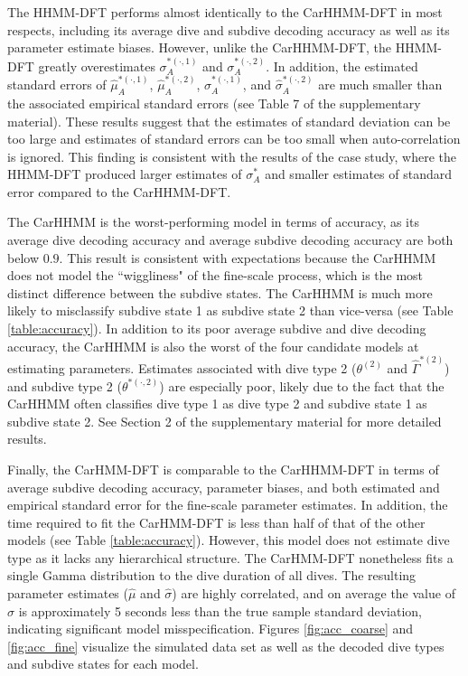 The HHMM-DFT performs almost identically to the CarHHMM-DFT in most respects, including its average dive and subdive decoding accuracy as well as its parameter estimate biases. However, unlike the CarHHMM-DFT, the HHMM-DFT greatly overestimates $\sigma_A^{*(\cdot,1)}$ and $\sigma_A^{*(\cdot,2)}$. In addition, the estimated standard errors of $\hat \mu_A^{*(\cdot,1)}$, $\hat \mu_A^{*(\cdot,2)}$, $\hat \sigma_A^{*(\cdot,1)}$, and $\hat \sigma_A^{*(\cdot,2)}$ are much smaller than the associated empirical standard errors (see Table 7 of the supplementary material). These results suggest that the estimates of standard deviation can be too large and estimates of standard errors can be too small when auto-correlation is ignored. This finding is consistent with the results of the case study, where the HHMM-DFT produced larger estimates of $\sigma_A^*$ and smaller estimates of standard error compared to the CarHHMM-DFT.

The CarHHMM is the worst-performing model in terms of accuracy, as its average dive decoding accuracy and average subdive decoding accuracy are both below $0.9$. This result is consistent with expectations because the CarHHMM does not model the ``wiggliness" of the fine-scale process, which is the most distinct difference between the subdive states. The CarHHMM is much more likely to misclassify subdive state 1 as subdive state 2 than vice-versa (see Table \ref{table:accuracy}). In addition to its poor average subdive and dive decoding accuracy, the CarHHMM is also the worst of the four candidate models at estimating parameters. Estimates associated with dive type 2 ($\theta^{(2)}$ and $\hat \Gamma^{*(2)}$) and subdive type 2 ($\theta^{*(\cdot,2)}$) are especially poor, likely due to the fact that the CarHHMM often classifies dive type 1 as dive type 2 and subdive state 1 as subdive state 2. See Section 2 of the supplementary material for more detailed results.

Finally, the CarHMM-DFT is comparable to the CarHHMM-DFT in terms of average subdive decoding accuracy, parameter biases, and both estimated and empirical standard error for the fine-scale parameter estimates. In addition, the time required to fit the CarHMM-DFT is less than half of that of the other models (see Table \ref{table:accuracy}). However, this model does not estimate dive type as it lacks any hierarchical structure. The CarHMM-DFT nonetheless fits a single Gamma distribution to the dive duration of all dives. The resulting parameter estimates ($\hat \mu$ and $\hat \sigma$) are highly correlated, and on average the value of $\hat \sigma$ is approximately 5 seconds less than the true sample standard deviation, indicating significant model misspecification. Figures \ref{fig:acc_coarse} and \ref{fig:acc_fine} visualize the simulated data set as well as the decoded dive types and subdive states for each model.